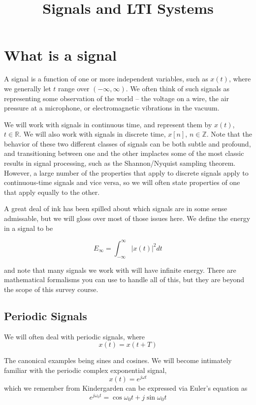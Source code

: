 

\title{Signals and LTI Systems}

\maketitle



\section{What is a signal }

A signal is a function of one or more independent variables, such as
$x(t)$, where we generally let $t$ range over $(-\infty, \infty)$. We
often think of such signals as representing some observation of the
world -- the voltage on a wire, the air pressure at a microphone, or
electromagnetic vibrations in the vacuum.

We will work with signals in continuous time, and represent them by
$x(t)$, $t \in \mathbb{R}$. We will also work with signals in discrete
time, $x[n]$, $n \in \mathbb{Z}$. Note that the behavior of these two
different classes of signals can be both subtle and profound, and
transitioning between one and the other implactes some of the most
classic results in signal processing, such as the Shannon/Nyquist
sampling theorem. However, a large number of the properties that apply
to discrete signals apply to continuous-time signals and vice versa,
so we will often state properties of one that apply equally to the
other. 


A great deal of ink has been spilled about which signals are
in some sense admissable, but we will gloss over most of those
issues here. We define the energy in a signal to be

\[
E_\infty = \int_{-\infty}^{\infty} |x(t)|^2 dt
\]

and note that many signals we work with will have infinite energy. 
There are mathematical formalisms you can use to handle all of this, 
but they are beyond the scope of this survey course. 

\subsection{Periodic Signals}
We will often deal with periodic signals, where
\[
x(t) = x(t+T)
\]

The canonical examples being sines and cosines. We will become intimately 
familiar with the periodic complex exponential signal, 
\[
x(t) = e^{j \omega t}
\]
which we remember from Kindergarden can be expressed via Euler's equation 
as 
\[
e^{j \omega_0 t} = \cos \omega_0 t + j \sin \omega_0 t
\]

